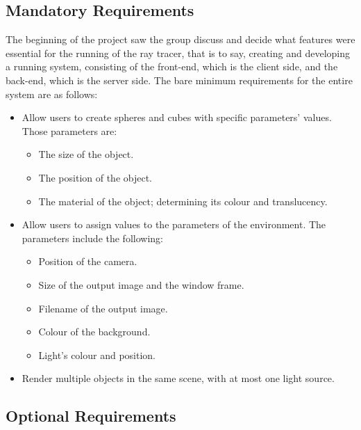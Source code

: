 \documentclass[a4paper]{article}
\begin{document}
	
	\subsection{Mandatory Requirements}
	
	
	The beginning of the project saw the group discuss and decide what features were essential for the running of the ray tracer, that is to say, creating and developing a running system, consisting of the front-end, which is the client side, and the back-end, which is the server side. The bare minimum requirements for the entire system are as follows:
	\begin{itemize}
		\item Allow users to create spheres and cubes with specific parameters' values. Those parameters are:
		\begin{itemize}
			\item The size of the object.
			\item The position of the object.
			\item The material of the object; determining its colour and translucency.
		\end{itemize}
		\item Allow users to assign values to the parameters of the environment. The parameters include the following:
		\begin{itemize}
			\item Position of the camera.
			\item Size of the output image and the window frame.
			\item Filename of the output image.
			\item Colour of the background.
			\item Light's colour and position.
		\end{itemize}
		\item Render multiple objects in the same scene, with at most one light source.
	\end{itemize}
	
	
	\subsection{Optional Requirements}
	
\end{document}
